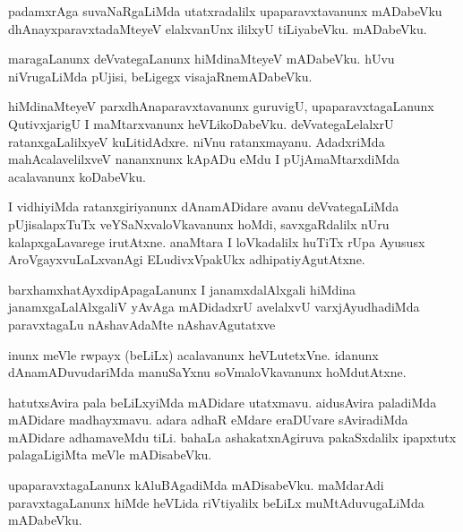 \documentclass{article}
\begin{document}
\begin{mn}
padamxrAga  suvaNaRgaLiMda  utatxradalilx  upaparavxtavanunx  mADabeVku  dhAnayxparavxtadaMteyeV  
elalxvanUnx  ililxyU  tiLiyabeVku.  mADabeVku.
\end{mn}

\begin{mn}
maragaLanunx  deVvategaLanunx  hiMdinaMteyeV  mADabeVku.  hUvu  niVrugaLiMda  pUjisi,  
beLigegx  visajaRnemADabeVku.
\end{mn}

\begin{mn}
hiMdinaMteyeV  parxdhAnaparavxtavanunx  guruvigU,  upaparavxtagaLanunx  QutivxjarigU  I  maMtarxvanunx  
heVLikoDabeVku.  deVvategaLelalxrU  ratanxgaLalilxyeV  kuLitidAdxre.  niVnu  ratanxmayanu.  
AdadxriMda mahAcalavelilxveV  nananxnunx  kApADu  eMdu  I  pUjAmaMtarxdiMda  acalavanunx  koDabeVku.
\end{mn}

\begin{mn}
I  vidhiyiMda  ratanxgiriyanunx  dAnamADidare  avanu  deVvategaLiMda  pUjisalapxTuTx  
veYSaNxvaloVkavanunx  hoMdi,  savxgaRdalilx  nUru  kalapxgaLavarege  irutAtxne.  anaMtara  
I  loVkadalilx  huTiTx  rUpa  Ayususx  AroVgayxvuLaLxvanAgi  ELudivxVpakUkx  adhipatiyAgutAtxne.
\end{mn}

\begin{mn}
barxhamxhatAyxdipApagaLanunx  I  janamxdalAlxgali  hiMdina  janamxgaLalAlxgaliV  yAvAga  
mADidadxrU  avelalxvU  varxjAyudhadiMda  paravxtagaLu  nAshavAdaMte  nAshavAgutatxve
\end{mn}

\begin{mn}
inunx  meVle  rwpayx (beLiLx) acalavanunx  heVLutetxVne.  idanunx  dAnamADuvudariMda  
manuSaYxnu  soVmaloVkavanunx  hoMdutAtxne.
\end{mn}

\begin{mn}
hatutxsAvira  pala beLiLxyiMda  mADidare  utatxmavu.  aidusAvira  paladiMda  mADidare  
madhayxmavu.  adara  adhaR  eMdare  eraDUvare  sAviradiMda  mADidare  adhamaveMdu  tiLi.  
bahaLa  ashakatxnAgiruva  pakaSxdalilx  ipapxtutx  palagaLigiMta  meVle  mADisabeVku.
\end{mn}

\begin{mn}
upaparavxtagaLanunx   kAluBAgadiMda  mADisabeVku.  maMdarAdi  paravxtagaLanunx  hiMde  
heVLida  riVtiyalilx  beLiLx  muMtAduvugaLiMda  mADabeVku.
\end{mn}
\end{document}
